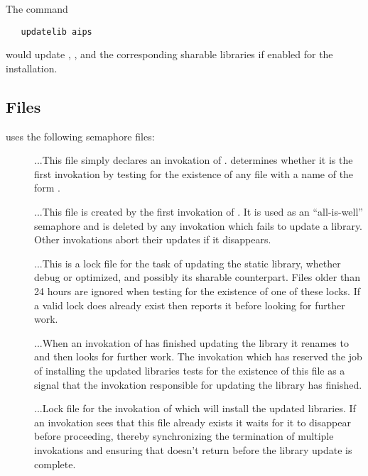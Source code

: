 The command

\begin{verbatim}
   updatelib aips
\end{verbatim}

\noindent
would update , , and the
corresponding sharable libraries if enabled for the installation.

\subsection*{Files}

 uses the following semaphore files:

\begin{description}
\item[]
...This file simply declares an invokation of .
 determines whether it is the first invokation by testing for
the existence of any file with a name of the form .

\item[]
...This file is created by the first invokation of .  It is
used as an ``all-is-well'' semaphore and is deleted by any invokation which
fails to update a library.  Other invokations abort their updates if it
disappears.

\item[]
...This is a lock file for the task of updating the static library, whether
debug or optimized, and possibly its sharable counterpart.  Files older than
24 hours are ignored when testing for the existence of one of these locks.  If
a valid lock does already exist then  reports it before looking
for further work.

\item[]
...When an invokation of  has finished updating the library it
renames  to  and then looks for
further work.  The invokation which has reserved the job of installing the
updated libraries tests for the existence of this file as a signal that the
invokation responsible for updating the library has finished.

\item[]
...Lock file for the invokation of  which will install the
updated libraries.  If an invokation sees that this file already exists it
waits for it to disappear before proceeding, thereby synchronizing the
termination of multiple invokations and ensuring that  doesn't
return before the library update is complete.
\end{description}

